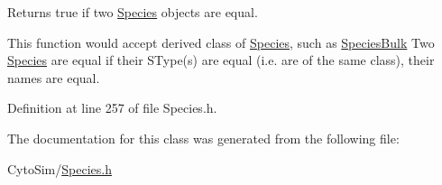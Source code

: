 Returns true if two \hyperlink{classchem_1_1Species}{Species} objects are equal. 

This function would accept derived class of \hyperlink{classchem_1_1Species}{Species}, such as \hyperlink{classchem_1_1SpeciesBulk}{Species\-Bulk} Two \hyperlink{classchem_1_1Species}{Species} are equal if their S\-Type(s) are equal (i.\-e. are of the same class), their names are equal. 

Definition at line 257 of file Species.\-h.



The documentation for this class was generated from the following file\-:\begin{DoxyCompactItemize}
\item 
Cyto\-Sim/\hyperlink{Species_8h}{Species.\-h}\end{DoxyCompactItemize}
